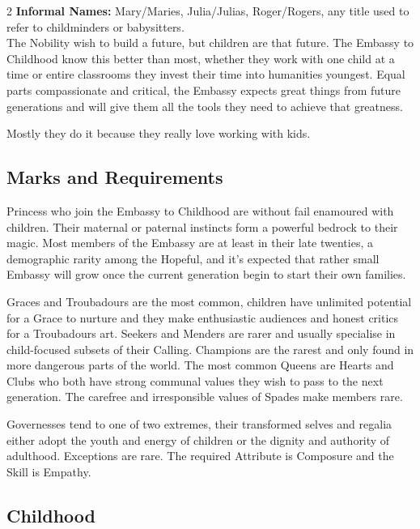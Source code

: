 \begin{multicols}{2}
\noindent \textbf{Informal Names:} Mary/Maries, Julia/Julias, Roger/Rogers, any title used to refer to childminders or babysitters. \\

\noindent The Nobility wish to build a future, but children are that future. The Embassy to Childhood know this better than most, whether they work with one child at a time or entire classrooms they invest their time into humanities youngest. Equal parts compassionate and critical, the Embassy expects great things from future generations and will give them all the tools they need to achieve that greatness.

Mostly they do it because they really love working with kids. 

\subsection*{Marks and Requirements}

Princess who join the Embassy to Childhood are without fail enamoured with children. Their maternal or paternal instincts form a powerful bedrock to their magic. Most members of the Embassy are at least in their late twenties, a demographic rarity among the Hopeful, and it’s expected that rather small Embassy will grow once the current generation begin to start their own families.

Graces and Troubadours are the most common, children have unlimited potential for a Grace to nurture and they make enthusiastic audiences and honest critics for a Troubadours art. Seekers and Menders are rarer and usually specialise in child-focused subsets of their Calling. Champions are the rarest and only found in more dangerous parts of the world. The most common Queens are Hearts and Clubs who both have strong communal values they wish to pass to the next generation. The carefree and irresponsible values of Spades make members rare.

Governesses tend to one of two extremes, their transformed selves and regalia either adopt the youth and energy of children or the dignity and authority of adulthood. Exceptions are rare. The required Attribute is Composure and the Skill is Empathy. 

\begin{mybox}

\subsection*{Childhood}


\end{mybox}
\end{multicols}
